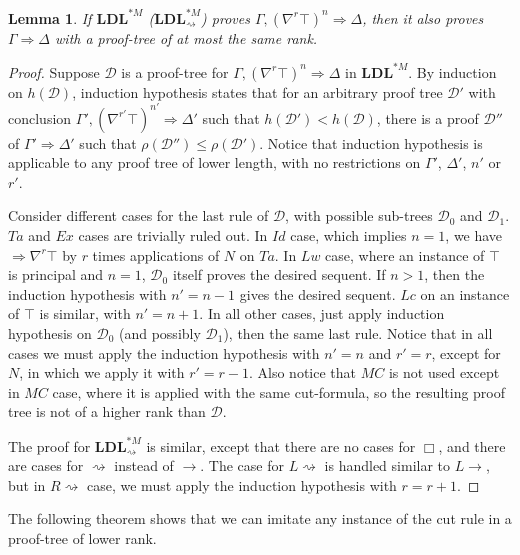\documentclass[12pt,a4paper]{article}
\theoremstyle{plain}
\newtheorem{lem}[thm]{Lemma}
\theoremstyle{definition}
\begin{document}
\begin{lem}\label{lem:ldls-top-redundant} If $\mathbf{LDL}^{*M}$ ($\mathbf{LDL}^{*M}_{\rightsquigarrow}$) proves $\Gamma , (\nabla^r \top)^n \Rightarrow \Delta$, then it also proves $\Gamma \Rightarrow \Delta$ with a proof-tree of at most the same rank.
\end{lem}
\begin{proof}
Suppose $\mathcal{D}$ is a proof-tree for $\Gamma , (\nabla^r \top)^n \Rightarrow \Delta$ in $\mathbf{LDL}^{*M}$. By induction on $h(\mathcal{D})$, induction hypothesis states that for an arbitrary proof tree $\mathcal{D}'$ with conclusion $\Gamma' , (\nabla^{r'} \top)^{n'} \Rightarrow \Delta'$ such that $h(\mathcal{D}') < h(\mathcal{D})$, there is a proof $\mathcal{D}''$ of $\Gamma' \Rightarrow \Delta'$ such that $\rho(\mathcal{D}'') \leq \rho(\mathcal{D}')$. Notice that induction hypothesis is applicable to any proof tree of lower length, with no restrictions on $\Gamma'$, $\Delta'$, $n'$ or $r'$.

Consider different cases for the last rule of $\mathcal{D}$, with possible sub-trees $\mathcal{D}_0$ and $\mathcal{D}_1$. $Ta$ and $Ex$ cases are trivially ruled out. In $Id$ case, which implies $n = 1$, we have $\Rightarrow \nabla^r \top$ by $r$ times applications of $N$ on $Ta$. In $Lw$ case, where an instance of $\top$ is principal and $n = 1$, $\mathcal{D}_0$ itself proves the desired sequent. If $n > 1$, then the induction hypothesis with $n' = n - 1$ gives the desired sequent. $Lc$ on an instance of $\top$ is similar, with $n' = n + 1$. In all other cases, just apply induction hypothesis on $\mathcal{D}_0$ (and possibly $\mathcal{D}_1$), then the same last rule. Notice that in all cases we must apply the induction hypothesis with $n' = n$ and $r' = r$, except for $N$, in which we apply it with $r' = r - 1$. Also notice that $MC$ is not used except in $MC$ case, where it is applied with the same cut-formula, so the resulting proof tree is not of a higher rank than $\mathcal{D}$.

The proof for $\mathbf{LDL}^{*M}_{\rightsquigarrow}$ is similar, except that there are no cases for $\Box$, and there are cases for $\rightsquigarrow$ instead of $\rightarrow$. The case for $L\rightsquigarrow$ is handled similar to $L\rightarrow$, but in $R\rightsquigarrow$ case, we must apply the induction hypothesis with $r = r + 1$.
\end{proof}

The following theorem shows that we can imitate any instance of the cut rule in a proof-tree of lower rank.
\end{document}

